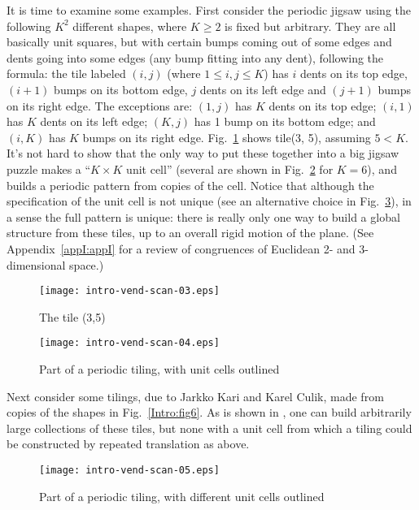 \documentclass[reqno]{stml-l}
\theoremstyle{plain}
\theoremstyle{definition}
\numberwithin{equation}{chapter}
\begin{document}
It is time to examine some examples. First consider the periodic jigsaw using the following $K^{2}$ different shapes, where $K\geq 2$ is fixed but arbitrary. They are all basically unit squares, but with certain bumps coming out of some edges and dents going into some edges (any bump fitting into any dent), following the formula: the tile labeled $(i,j)$ (where $1\leq i,j\leq K$) has $i$ dents on its top edge, $(i+1)$ bumps on its bottom edge, $j$ dents on its left edge and $(j+1)$ bumps on its right edge. The exceptions are: $(1, j)$ has $K$ dents on its top edge; $(i, 1)$ has $K$ dents on its left edge; $(K,j)$ has 1 bump on its bottom edge; and $(i, K)$ has $K$ bumps on its right edge. Fig.~\ref{Intro:fig3} shows tile(3, 5), assuming $5<K$. It's not hard to show that the only way to put these together into a big jigsaw puzzle makes a ``$K\times K$ unit cell'' (several are shown in Fig.~\ref{Intro:fig4} for $K=6$), and builds a periodic pattern from copies of the cell. Notice that although the specification of the unit cell is not unique (see an alternative choice in Fig.~\ref{Intro:fig5}), in a sense the full pattern is unique: there is really only one way to build a global structure from these tiles, up to an overall rigid motion of the plane. (See Appendix~\ref{appI:appI} for a review of congruences of Euclidean 2- and 3-dimensional space.)
\begin{figure}[!h]
\texttt{[image: intro-vend-scan-03.eps]}
\caption{The tile (3,5)}\label{Intro:fig3}
\end{figure}

\begin{figure}[!h]
\texttt{[image: intro-vend-scan-04.eps]}
\caption{Part of a periodic tiling, with unit cells outlined}
\label{Intro:fig4}
\end{figure}


Next consider some tilings, due to Jarkko Kari and Karel Culik, made from copies of the shapes in Fig.~\ref{Intro:fig6}. As is shown in \cite{bib:Cul}, one can build arbitrarily large collections of these tiles, but none with a unit cell from which a tiling could be constructed by repeated translation as above.
\begin{figure}[!h]
\texttt{[image: intro-vend-scan-05.eps]}
\caption{Part of a periodic tiling, with different unit cells
outlined}\label{Intro:fig5}
\end{figure}
\end{document}
